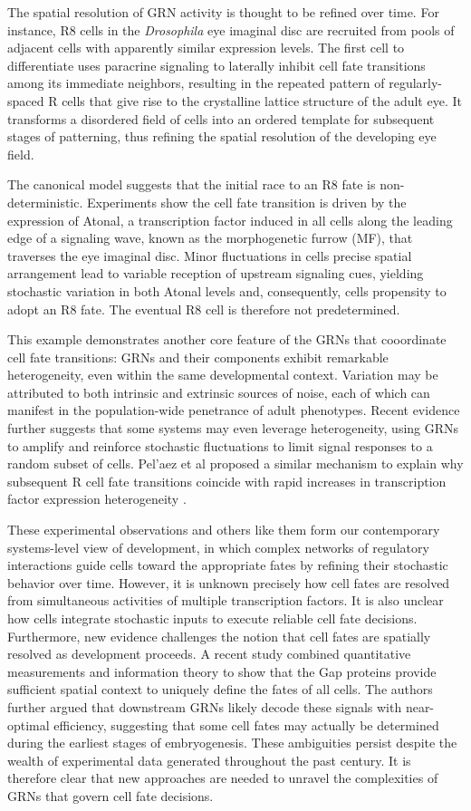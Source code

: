 The spatial resolution of GRN activity is thought to be refined over time. For instance, R8 cells in the \textit{Drosophila} eye imaginal disc are recruited from pools of adjacent cells with apparently similar expression levels. The first cell to differentiate uses paracrine signaling to laterally inhibit cell fate transitions among its immediate neighbors, resulting in the repeated pattern of regularly-spaced R cells that give rise to the crystalline lattice structure of the adult eye. It transforms a disordered field of cells into an ordered template for subsequent stages of patterning, thus refining the spatial resolution of the developing eye field. 

The canonical model suggests that the initial race to an R8 fate is non-deterministic. Experiments show the cell fate transition is driven by the expression of Atonal, a transcription factor induced in all cells along the leading edge of a signaling wave, known as the morphogenetic furrow (MF), that traverses the eye imaginal disc. Minor fluctuations in cells precise spatial arrangement lead to variable reception of upstream signaling cues, yielding stochastic variation in both Atonal levels and, consequently, cells propensity to adopt an R8 fate. The eventual R8 cell is therefore not predetermined.

This example demonstrates another core feature of the GRNs that cooordinate cell fate transitions: GRNs and their components exhibit remarkable heterogeneity, even within the same developmental context. Variation may be attributed to both intrinsic and extrinsic sources of noise, each of which can manifest in the population-wide penetrance of adult phenotypes. Recent evidence further suggests that some systems may even leverage heterogeneity, using GRNs to amplify and reinforce stochastic fluctuations to limit signal responses to a random subset of cells. Pel'{a}ez et al proposed a similar mechanism to explain why subsequent R cell fate transitions coincide with rapid increases in transcription factor expression heterogeneity \cite{Pelaez2015}.

These experimental observations and others like them form our contemporary systems-level view of development, in which complex networks of regulatory interactions guide cells toward the appropriate fates by refining their stochastic behavior over time. However, it is unknown precisely how cell fates are resolved from simultaneous activities of multiple transcription factors. It is also unclear how cells integrate stochastic inputs to execute reliable cell fate decisions. Furthermore, new evidence challenges the notion that cell fates are spatially resolved as development proceeds. A recent study combined quantitative measurements and information theory to show that the Gap proteins provide sufficient spatial context to uniquely define the fates of all cells. The authors further argued that downstream GRNs likely decode these signals with near-optimal efficiency, suggesting that some cell fates may actually be determined during the earliest stages of embryogenesis. These ambiguities persist despite the wealth of experimental data generated throughout the past century. It is therefore clear that new approaches are needed to unravel the complexities of GRNs that govern cell fate decisions.


